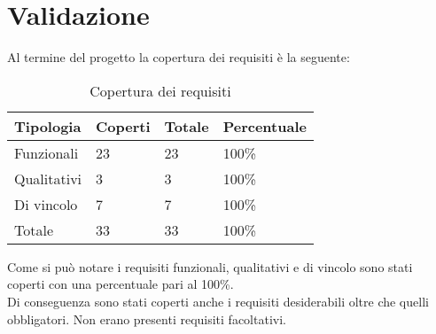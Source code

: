 \section{Validazione}
Al termine del progetto la copertura dei requisiti è la seguente:
\begin{table}[H]
  \begin{tabular}{|p{5.2cm}|p{1.5cm}|p{1.3cm}|p{2.3cm}|} 
  \hline
  \textbf{Tipologia} & \textbf{Coperti} & \textbf{Totale} &  \textbf{Percentuale} \\ 
  \hline
  Funzionali & 23 & 23 & 100\% \\ 
  \hline
  Qualitativi & 3 & 3 & 100\% \\ 
  \hline
  Di vincolo & 7 & 7 & 100\% \\ 
  \hline
  \hline
  Totale & 33 & 33 & 100\% \\ 
  \hline
  \end{tabular}
  \caption{Copertura dei requisiti}
\end{table}
\leavevmode\newline
Come si può notare i requisiti funzionali, qualitativi e di vincolo sono stati coperti con una percentuale pari al 100\%.
\\
Di conseguenza sono stati coperti anche i requisiti desiderabili oltre che quelli obbligatori. Non erano presenti requisiti 
facoltativi.